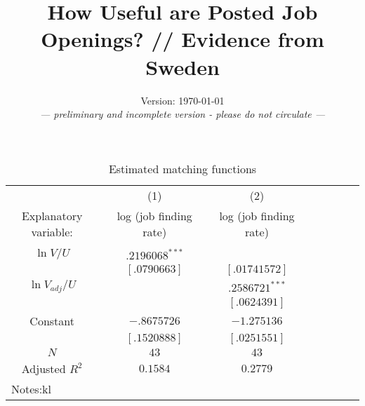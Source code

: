 \documentclass[11pt,article]{memoir}
\title{How Useful are Posted Job Openings? // Evidence from Sweden}
\date{Version: \today{}\\\emph{--- preliminary and incomplete version - please do not circulate ---}}
\begin{document}
\begin{table}%
\caption*{Estimated matching functions}
\begin{tabularx}{\linewidth}{cXcXcXcXcX}
\hline
&& (1)							
&& (2)					\\
Explanatory variable: 
&& log (job finding rate)
&& log (job finding rate) 	\\		
\hline 
\\
$\ln V/U$ 		
& & $ .2196068 ^{***}$          								
& & 	   				        							
& &\\[0 mm]
&&\scriptsize{$[.0790663]$}       
&&\scriptsize{$[.01741572]$}
\\
$\ln V_{adj}/U$        
& 								
& 		
&	
&	$.2586721^{***}$						
\\[0 mm]
&&\scriptsize{$$}       
&&\scriptsize{$[.0624391]$}
\\	
Constant 
& & $-.8675726 $									
& & $-1.275136 $		
\\	[0 mm]
&&\scriptsize{$[.1520888 ]$}       
&&\scriptsize{$[.0251551 ]$} 
\\
$N $
& & $43$									
& & $43$		   				
\\	
Adjusted $R^2$
& & $0.1584$
& & $0.2779$		   				
\\		
\hline 
\multicolumn{3}{l}{Notes:kl}
\end{tabularx}
\end{table}
\end{document}
